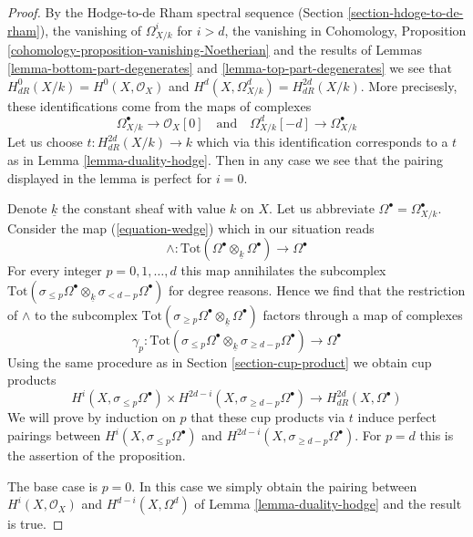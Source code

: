 \begin{proof}
By the Hodge-to-de Rham spectral sequence
(Section \ref{section-hdoge-to-de-rham}), the vanishing
of $\Omega^i_{X/k}$ for $i > d$, the vanishing in
Cohomology, Proposition \ref{cohomology-proposition-vanishing-Noetherian}
and the results of Lemmas \ref{lemma-bottom-part-degenerates} and
\ref{lemma-top-part-degenerates}
we see that $H^0_{dR}(X/k) = H^0(X, \mathcal{O}_X)$
and $H^d(X, \Omega^d_{X/k}) = H_{dR}^{2d}(X/k)$.
More precisesly, these identifications come from the maps
of complexes
$$
\Omega^\bullet_{X/k} \to \mathcal{O}_X[0]
\quad\text{and}\quad
\Omega^d_{X/k}[-d] \to \Omega^\bullet_{X/k}
$$
Let us choose $t : H_{dR}^{2d}(X/k) \to k$ which via this identification
corresponds to a $t$ as in Lemma \ref{lemma-duality-hodge}.
Then in any case we see that the pairing displayed in the lemma
is perfect for $i = 0$.

\medskip\noindent
Denote $\underline{k}$ the constant sheaf with value $k$ on $X$.
Let us abbreviate $\Omega^\bullet = \Omega^\bullet_{X/k}$.
Consider the map (\ref{equation-wedge}) which in our situation reads
$$
\wedge :
\text{Tot}(\Omega^\bullet \otimes_{\underline{k}} \Omega^\bullet)
\longrightarrow
\Omega^\bullet
$$
For every integer $p = 0, 1, \ldots, d$ this map
annihilates the subcomplex
$\text{Tot}(\sigma_{\leq p} \Omega^\bullet \otimes_{\underline{k}}
\sigma_{< d - p} \Omega^\bullet)$ for degree reasons.
Hence we find that the restriction of $\wedge$ to the subcomplex
$\text{Tot}(\sigma_{\geq p}\Omega^\bullet \otimes_{\underline{k}}
\Omega^\bullet)$ factors through a map of complexes
$$
\gamma_p :
\text{Tot}(\sigma_{\leq p} \Omega^\bullet \otimes_{\underline{k}}
\sigma_{\geq d - p} \Omega^\bullet)
\longrightarrow
\Omega^\bullet
$$
Using the same procedure as in Section \ref{section-cup-product} we obtain
cup products
$$
H^i(X, \sigma_{\leq p} \Omega^\bullet) \times
H^{2d - i}(X, \sigma_{\geq d - p}\Omega^\bullet)
\longrightarrow
H_{dR}^{2d}(X, \Omega^\bullet)
$$
We will prove by induction on $p$ that these cup products via $t$
induce perfect pairings between $H^i(X, \sigma_{\leq p} \Omega^\bullet)$
and $H^{2d - i}(X, \sigma_{\geq d - p}\Omega^\bullet)$. For $p = d$
this is the assertion of the proposition.

\medskip\noindent
The base case is $p = 0$. In this case we simply obtain the pairing
between $H^i(X, \mathcal{O}_X)$ and $H^{d - i}(X, \Omega^d)$ of
Lemma \ref{lemma-duality-hodge} and the result is true.


\end{proof}
